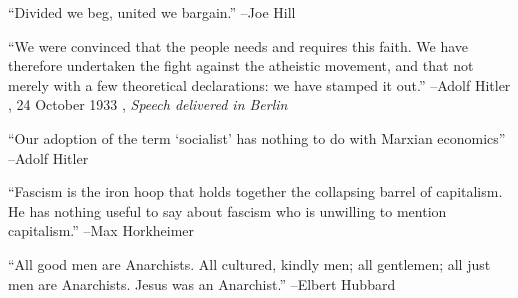 \documentclass{article}%
\begin{document}
\linebreak%
\vspace{1mm}%
\begin{minipage}{\textwidth}%
\flushleft%
“Divided we beg, united we bargain.”%
\linebreak%
\vspace{1mm}%
–Joe Hill%
\linebreak%
\vspace{1mm}%
\end{minipage}%
\linebreak%
\vspace{1mm}%
\begin{minipage}{\textwidth}%
\flushleft%
“We were convinced that the people needs and requires this faith. We have therefore undertaken the fight against the atheistic movement, and that not merely with a few theoretical declarations: we have stamped it out.”%
\linebreak%
\vspace{1mm}%
–Adolf Hitler%
, 24 October 1933%
, \textit{Speech delivered in Berlin}%
\linebreak%
\vspace{1mm}%
\end{minipage}%
\linebreak%
\vspace{1mm}%
\begin{minipage}{\textwidth}%
\flushleft%
“Our adoption of the term ‘socialist’ has nothing to do with Marxian economics”%
\linebreak%
\vspace{1mm}%
–Adolf Hitler%
\linebreak%
\vspace{1mm}%
\end{minipage}%
\linebreak%
\vspace{1mm}%
\begin{minipage}{\textwidth}%
\flushleft%
“Fascism is the iron hoop that holds together the collapsing barrel of capitalism. He has nothing useful to say about fascism who is unwilling to mention capitalism.”%
\linebreak%
\vspace{1mm}%
–Max Horkheimer%
\linebreak%
\vspace{1mm}%
\end{minipage}%
\linebreak%
\vspace{1mm}%
\begin{minipage}{\textwidth}%
\flushleft%
“All good men are Anarchists. All cultured, kindly men; all gentlemen; all just men are Anarchists. Jesus was an Anarchist.”%
\linebreak%
\vspace{1mm}%
–Elbert Hubbard%
\linebreak%
\vspace{1mm}%
\end{minipage}%
\end{document}
